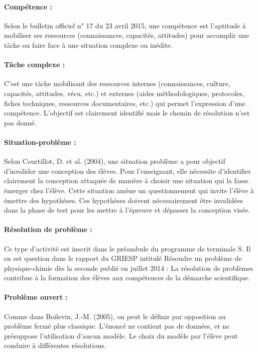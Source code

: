 \documentclass[12pt,a4paper]{article}
\begin{document}
\paragraph{Compétence :}
Selon le bulletin officiel n° 17 du 23 avril 2015, \og une compétence est l'aptitude à mobiliser ses ressources (connaissances, capacités, attitudes) pour accomplir une tâche ou faire face à une situation complexe ou inédite. \fg{} 

\paragraph{Tâche complexe :}
C'est une tâche mobilisant des ressources internes (connaissances, culture, capacités, attitudes, vécu, etc.) et externes (aides méthodologiques,  protocoles, fiches techniques, ressources documentaires, etc.) qui permet l'expression d'une compétence.
L'objectif est clairement identifié mais le chemin de résolution n'est pas donné.

\paragraph{Situation-problème :}
Selon Courtillot, D. et al. (2004), une situation problème a pour objectif d'invalider une conception des élèves.
Pour l'enseignant, elle nécessite d'identifier clairement la conception attaquée de manière à choisir une situation qui la fasse émerger chez l'élève.
Cette situation amène un questionnement qui invite l'élève à émettre des hypothèses.
Ces hypothèses \og doivent nécessairement être invalidées dans la phase de test pour les mettre à l'épreuve et dépasser la conception visée. \fg{}

\paragraph{Résolution de problème :}
Ce type d'activité est inscrit dans le préambule du programme de terminale S.
Il en est question dans le rapport du GRIESP intitulé Résoudre un problème de physique-chimie dès la seconde publié en juillet 2014 : \og La résolution de problèmes contribue à la formation des élèves aux compétences de la démarche scientifique. \fg{}

\paragraph{Problème ouvert :}
Comme dans Boilevin, J.-M. (2005), on peut le définir par opposition au problème fermé plus classique.
L'énoncé ne contient pas de données, et ne présuppose l'utilisation d'aucun modèle.
Le choix du modèle par l'élève peut conduire à différentes résolutions.
\end{document}
